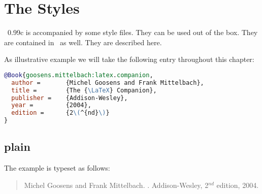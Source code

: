 
\chapter{The Styles}

\BibTeX~0.99c is accompanied by some
style files. They can be used out of the box. They are contained in
\ExBib\ as well. They are described here.

\def\MACRO#1#2{\texttt{#1} $\hookrightarrow$ \texttt{#2}\\}%
\def\Entry#1{\texttt{#1}}%
\def\Field#1{\texttt{#1}}%
\makeatletter
\newenvironment{BstSample}{%
  \begingroup
  \let\bib@heading\relax
  \begin{quotation}
}{
  \end{quotation}
  \endgroup
}%
\makeatother

As illustrative example we will take the following entry throughout
this chapter:

\begin{lstlisting}[language=BibTeX]
@Book{goosens.mittelbach:latex.companion,
  author =       {Michel Goosens and Frank Mittelbach},
  title =        {The {\LaTeX} Companion},
  publisher =    {Addison-Wesley},
  year =         {2004},
  edition =      {2\(^{nd}\)}
}
\end{lstlisting}

\section{plain}

\INCOMPLETE

The example is typeset as follows:
\begin{BstSample}
\begin{thebibliography}{10}

Michel Goosens and Frank Mittelbach.
.
\newblock Addison-Wesley, 2\(^{nd}\) edition, 2004.

\end{thebibliography}
\end{BstSample}

